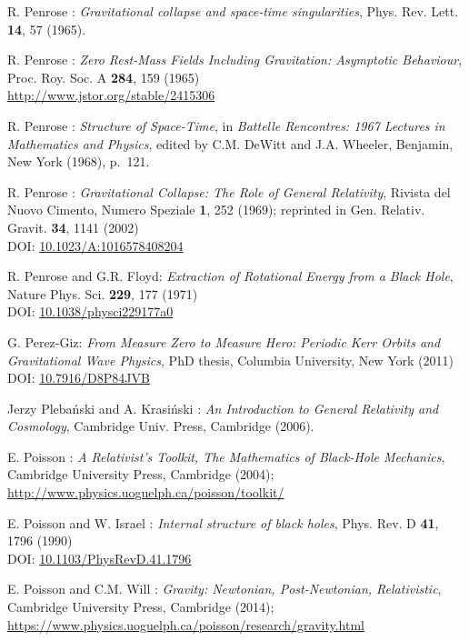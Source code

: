 \begin{thebibliography}{123}
R. Penrose : {\em Gravitational collapse and space-time singularities},
Phys. Rev. Lett. {\bf 14}, 57 (1965).

R. Penrose :
{\em Zero Rest-Mass Fields Including Gravitation: Asymptotic Behaviour},
Proc. Roy. Soc. A {\bf 284}, 159 (1965)\\
\url{http://www.jstor.org/stable/2415306}

R. Penrose : {\em Structure of Space-Time},
in {\em Battelle Rencontres: 1967 Lectures in Mathematics and Physics},
edited by C.M. DeWitt and J.A. Wheeler,
Benjamin, New York (1968), p.~121.

R. Penrose : {\em Gravitational Collapse: The Role of General Relativity},
Rivista del Nuovo Cimento, Numero Speziale {\bf 1}, 252 (1969); reprinted in
Gen. Relativ. Gravit. {\bf 34}, 1141 (2002)\\
DOI: \href{https://doi.org/10.1023/A:1016578408204}{10.1023/A:1016578408204}

R. Penrose and G.R. Floyd: {\em Extraction of Rotational Energy from
a Black Hole},  Nature Phys. Sci. {\bf 229}, 177 (1971)\\
DOI: \href{https://doi.org/10.1038/physci229177a0}{10.1038/physci229177a0}

G. Perez-Giz: {\em From Measure Zero to Measure Hero:
Periodic Kerr Orbits and Gravitational Wave Physics},
PhD thesis, Columbia University, New York (2011)\\
DOI: \href{https://doi.org/10.7916/D8P84JVB}{10.7916/D8P84JVB}

Jerzy Pleba\'nski and A. Krasi\'nski :
{\em An Introduction to General Relativity and Cosmology},
Cambridge Univ. Press, Cambridge (2006).

E. Poisson : \emph{A Relativist's Toolkit,
The Mathematics of Black-Hole Mechanics},
Cambridge University Press, Cambridge (2004); \\
\url{http://www.physics.uoguelph.ca/poisson/toolkit/}

E. Poisson and W. Israel : {\em Internal structure of black holes},
Phys. Rev. D {\bf 41}, 1796 (1990) \\
DOI: \href{https://doi.org/10.1103/PhysRevD.41.1796}{10.1103/PhysRevD.41.1796}

E. Poisson and C.M. Will : {\em Gravity: Newtonian, Post-Newtonian, Relativistic},
Cambridge University Press, Cambridge (2014); \\
\url{https://www.physics.uoguelph.ca/poisson/research/gravity.html}


\end{thebibliography}

